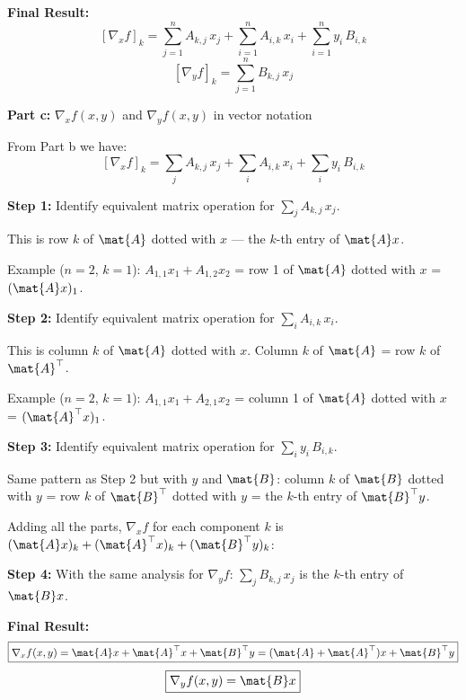 \documentclass{article}
\begin{document}
\begin{aprob}
    \medskip
    \textbf{Final Result:}
    \[
        \boxed{\left[\nabla_x f\right]_k = \sum_{j=1}^n A_{k,j}\, x_j + \sum_{i=1}^n A_{i,k}\, x_i + \sum_{i=1}^n y_i\, B_{i,k}}
    \]
    \[
        \boxed{\left[\nabla_y f\right]_k = \sum_{j=1}^n B_{k,j}\, x_j}
    \]

    \bigskip
    \begin{mdframed}
    \textbf{\large Part c:} $\nabla_x f(x,y)$ and $\nabla_y f(x,y)$ in vector notation
    \end{mdframed}

    From Part b we have:
    \[
        [\nabla_x f]_k = \sum_j A_{k,j}\, x_j + \sum_i A_{i,k}\, x_i + \sum_i y_i\, B_{i,k}
    \]

    \textbf{Step 1:} Identify equivalent matrix operation for $\sum_j A_{k,j}\, x_j$.

    This is row $k$ of $\mat{A}$ dotted with $x$ --- the $k$-th entry of $\mat{A}x$.

    Example ($n=2$, $k=1$): $A_{1,1} x_1 + A_{1,2} x_2$ = row 1 of $\mat{A}$ dotted with $x$ = $(\mat{A}x)_1$.

    \medskip
    \textbf{Step 2:} Identify equivalent matrix operation for $\sum_i A_{i,k}\, x_i$.

    This is column $k$ of $\mat{A}$ dotted with $x$. Column $k$ of $\mat{A}$ = row $k$ of $\mat{A}^\top$.

    Example ($n=2$, $k=1$): $A_{1,1} x_1 + A_{2,1} x_2$ = column 1 of $\mat{A}$ dotted with $x$ = $(\mat{A}^\top x)_1$.

    \medskip
    \textbf{Step 3:} Identify equivalent matrix operation for $\sum_i y_i\, B_{i,k}$.

    Same pattern as Step 2 but with $y$ and $\mat{B}$: column $k$ of $\mat{B}$ dotted with $y$ = row $k$ of $\mat{B}^\top$ dotted with $y$ = the $k$-th entry of $\mat{B}^\top y$.

    \medskip
    Adding all the parts, $\nabla_x f$ for each component $k$ is $(\mat{A}x)_k + (\mat{A}^\top x)_k + (\mat{B}^\top y)_k$:

    \medskip
    \textbf{Step 4:} With the same analysis for $\nabla_y f$: $\sum_j B_{k,j}\, x_j$ is the $k$-th entry of $\mat{B}x$.

    \medskip
    \textbf{Final Result:}
    \[
        \boxed{\nabla_x f(x,y) = \mat{A}x + \mat{A}^\top x + \mat{B}^\top y = (\mat{A} + \mat{A}^\top)x + \mat{B}^\top y}
    \]
    \[
        \boxed{\nabla_y f(x,y) = \mat{B}x}
    \]

\end{aprob}
\end{document}
